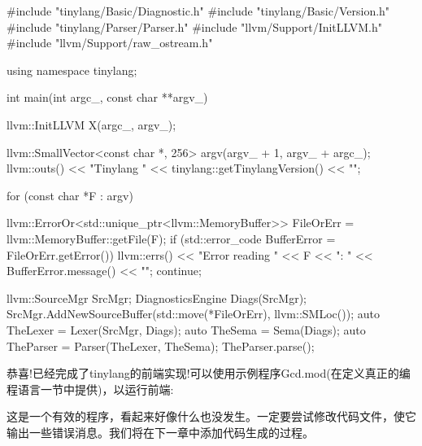 \begin{cpp}
#include "tinylang/Basic/Diagnostic.h"
#include "tinylang/Basic/Version.h"
#include "tinylang/Parser/Parser.h"
#include "llvm/Support/InitLLVM.h"
#include "llvm/Support/raw_ostream.h"

using namespace tinylang;

int main(int argc_, const char **argv_) {
    llvm::InitLLVM X(argc_, argv_);

    llvm::SmallVector<const char *, 256> argv(argv_ + 1,
                                              argv_ + argc_);
    llvm::outs() << "Tinylang "
                 << tinylang::getTinylangVersion() << "\n";

    for (const char *F : argv) {
        llvm::ErrorOr<std::unique_ptr<llvm::MemoryBuffer>>
            FileOrErr = llvm::MemoryBuffer::getFile(F);
        if (std::error_code BufferError =
                FileOrErr.getError()) {
            llvm::errs() << "Error reading " << F << ": "
                         << BufferError.message() << "\n";
            continue;
        }

        llvm::SourceMgr SrcMgr;
        DiagnosticsEngine Diags(SrcMgr);
        SrcMgr.AddNewSourceBuffer(std::move(*FileOrErr),
                                  llvm::SMLoc());
        auto TheLexer = Lexer(SrcMgr, Diags);
        auto TheSema = Sema(Diags);
        auto TheParser = Parser(TheLexer, TheSema);
        TheParser.parse();
    }
}
\end{cpp}

恭喜!已经完成了tinylang的前端实现!可以使用示例程序Gcd.mod(在定义真正的编程语言一节中提供)，以运行前端:


这是一个有效的程序，看起来好像什么也没发生。一定要尝试修改代码文件，使它输出一些错误消息。我们将在下一章中添加代码生成的过程。
